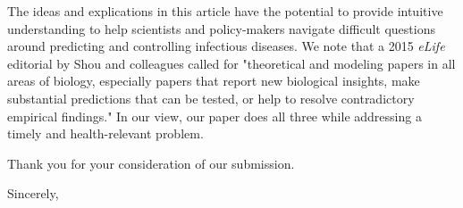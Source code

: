 \documentclass[10pt]{letter}
\begin{document}
\begin{letter}{
}
The ideas and explications in this article have the potential to provide intuitive understanding to help scientists and policy-makers navigate difficult questions around predicting and controlling infectious diseases.  We note that a 2015 \emph{eLife} editorial by Shou and colleagues \cite{shou2015theory} called for "theoretical and modeling papers in all areas of biology, especially papers that report new biological insights, make substantial predictions that can be tested, or help to resolve contradictory empirical findings." In our view, our paper does all three while addressing a timely and health-relevant problem.

Thank you for your consideration of our submission.

\closing{Sincerely,}



\end{letter}
\end{document}
